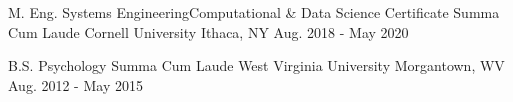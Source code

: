 


\begin{cventries}


\cventry
{M. Eng. Systems Engineering{\enskip\cdotp\enskip}Computational \& Data Science Certificate {\enskip\cdotp\enskip} Summa Cum Laude} %
{Cornell University} %
{Ithaca, NY} %
{Aug. 2018 -  May 2020} %
{}

\cventry
{B.S. Psychology {\enskip\cdotp\enskip} Summa Cum Laude} %
{West Virginia University} %
{Morgantown, WV} %
{Aug. 2012 -  May 2015} %
{}

\end{cventries}